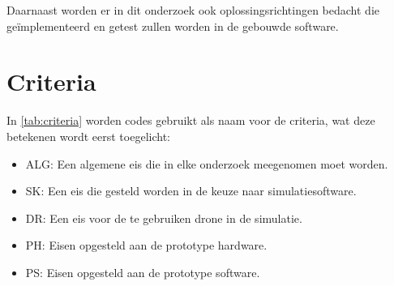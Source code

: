 \documentclass[a4paper, 11pt, oneside]{report}
\begin{document}
Daarnaast worden er in dit onderzoek ook oplossingsrichtingen bedacht die geïmplementeerd en getest zullen worden in de gebouwde software. 

\chapter{Criteria}
\label{chapter:criteria}

In \autoref{tab:criteria} worden codes gebruikt als naam voor de criteria, wat deze betekenen wordt eerst toegelicht:
\begin{itemize}
	\item ALG: Een algemene eis die in elke onderzoek meegenomen moet worden.
	\item SK: Een eis die gesteld worden in de keuze naar simulatiesoftware.
	\item DR: Een eis voor de te gebruiken drone in de simulatie.
	\item PH: Eisen opgesteld aan de prototype hardware.
	\item PS: Eisen opgesteld aan de prototype software.
\end{itemize}
\end{document}
